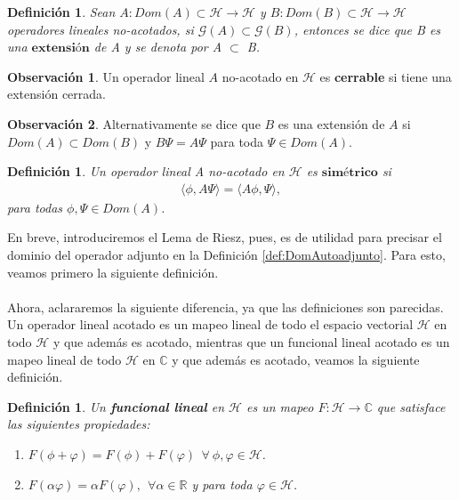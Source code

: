 \documentclass[12pt]{article}
\newtheorem{defn}[teo]{Definición}
\theoremstyle{definition}
\newtheorem{obs}{Observación}
\newcommand*{\field}[1]{\mathbb{#1}}
\begin{document}
\begin{defn}
    Sean $A:Dom(A)\subset\mathcal{H}\rightarrow\mathcal{H}$ y $B:Dom(B)\subset\mathcal{H}\rightarrow\mathcal{H}$ operadores lineales no-acotados, si $\mathcal{G}(A) \subset \mathcal{G}(B)$, entonces se dice que B es una $\textbf{extensión}$ de A y se denota por A $\subset$ B. 
    \label{def:Extension}
\end{defn}
\begin{obs}
    Un operador lineal $A$ no-acotado en $\mathcal{H}$ es \textbf{cerrable} si tiene una extensión cerrada.
    \label{obs:extcerrada}
\end{obs}
\begin{obs}
    Alternativamente se dice que $B$ es una extensión de $A$ si $Dom(A)\subset Dom(B)$ y $B\Psi = A\Psi$ para toda $\Psi \in Dom(A)$.
    \label{obs:defalt}
\end{obs}
\begin{defn}
    Un operador lineal A no-acotado en $\mathcal{H}$ es $\textbf{simétrico}$ si
    \begin{align*}
        \langle\phi,A\Psi\rangle = \langle A\phi,\Psi \rangle,
    \end{align*}
    para todas $\phi,\Psi \in Dom(A)$.
    \label{def:Simetrico}
\end{defn}
\noindent
En breve, introduciremos el Lema de Riesz, pues, es de utilidad para precisar el dominio del operador adjunto en la Definición \ref{def:DomAutoadjunto}. Para esto, veamos primero la siguiente definición. 
\\ \\
Ahora, aclararemos la siguiente diferencia, ya que las definiciones son parecidas. Un operador lineal acotado es un mapeo lineal de todo el espacio vectorial $\mathcal{H}$ en todo $\mathcal{H}$ y que además es acotado, mientras que un funcional lineal acotado es un mapeo lineal de todo $\mathcal{H}$ en $\field{C}$ y que además es acotado, veamos la siguiente definición.
\begin{defn}
    Un \textbf{funcional lineal} en $\mathcal{H}$ es un mapeo $F:\mathcal{H}\longrightarrow\field{C}$ que satisface las siguientes propiedades:
     \begin{enumerate}[1.]
    \item  $F(\phi + \varphi) = F(\phi) + F(\varphi)\:\: \forall\: \phi, \varphi \in \mathcal{H}$.
    \item $F(\alpha\varphi) = \alpha F(\varphi), \:\:\forall\alpha\in\field{R}$ y para toda $\varphi\in\mathcal{H}$.
    \end{enumerate}
\end{defn}
\end{document}

